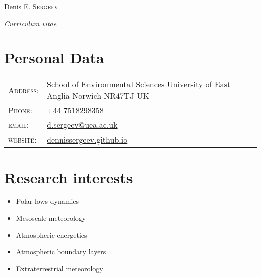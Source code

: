 \documentclass[a4paper,11pt]{article}
\newlength{\mycol}
\begin{document}
\pagestyle{empty} %
\flushleft

\par{\centering
		{\Huge Denis E. \textsc{Sergeev} \par
		 \normalsize \textit{Curriculum vitae}
		
	}\bigskip\par}

\section{Personal Data}
\renewcommand{\arraystretch}{1.2}
\begin{tabu} to 
    \textsc{Address:}   & School of Environmental Sciences \newline University of East Anglia \newline Norwich \newline NR47TJ \newline UK \\
    \textsc{Phone:}     & +44 7518298358\\
    \textsc{email:}     & \href{mailto:d.sergeev@uea.ac.uk}{d.sergeev@uea.ac.uk}\\
    \textsc{website:}     & \href{http://dennissergeev.github.io}{dennissergeev.github.io}
\end{tabu}
\renewcommand{\arraystretch}{1}

 \renewcommand{\labelitemi}{\scriptsize$\blacksquare$} 

\section{Research interests}
\begin{itemize}
 \item Polar lows dynamics
 \item Mesoscale meteorology
 \item Atmospheric energetics
 \item Atmospheric boundary layers
 \item Extraterrestrial meteorology
\end{itemize}
\end{document}
